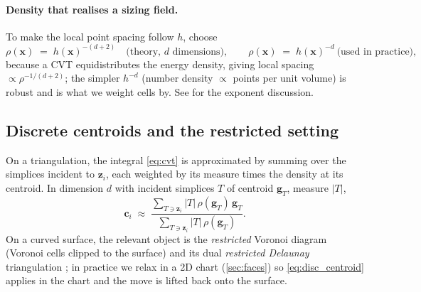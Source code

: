 \documentclass[11pt,a4paper]{article}
\numberwithin{equation}{section}
\newcommand{\abs}[1]{\left\lvert #1 \right\rvert}
\newcommand{\vv}[1]{\mathbf{#1}}
\begin{document}
\paragraph{Density that realises a sizing field.}
To make the local point spacing follow $h$, choose
\begin{equation}
\label{eq:density}
\rho(\vv{x}) \;=\; h(\vv{x})^{-(d+2)} \quad\text{(theory, $d$ dimensions)},
\qquad
\rho(\vv{x}) \;=\; h(\vv{x})^{-d}\ \text{(used in practice)},
\end{equation}
because a CVT equidistributes the energy density, giving local spacing
$\propto\rho^{-1/(d+2)}$; the simpler $h^{-d}$ (number density
$\propto$ points per unit volume) is robust and is what we weight cells by.
See \cite{DuWang2005,LevyLiu2010} for the exponent discussion.

\subsection{Discrete centroids and the restricted setting}
On a triangulation, the integral \eqref{eq:cvt} is approximated by summing over
the simplices incident to $\vv{z}_i$, each weighted by its measure times the
density at its centroid. In dimension $d$ with incident simplices $T$ of
centroid $\vv{g}_T$, measure $\abs{T}$,
\begin{equation}
\label{eq:disc_centroid}
\vv{c}_i \;\approx\;
\frac{\sum_{T\ni \vv{z}_i} \abs{T}\,\rho(\vv{g}_T)\,\vv{g}_T}
     {\sum_{T\ni \vv{z}_i} \abs{T}\,\rho(\vv{g}_T)}.
\end{equation}
On a curved surface, the relevant object is the \emph{restricted} Voronoi
diagram (Voronoi cells clipped to the surface) and its dual \emph{restricted
Delaunay} triangulation \cite{EdelsbrunnerShah1997,BoissonnatOudot2005}; in
practice we relax in a 2D chart (\cref{sec:faces}) so \eqref{eq:disc_centroid}
applies in the chart and the move is lifted back onto the surface.
\end{document}
